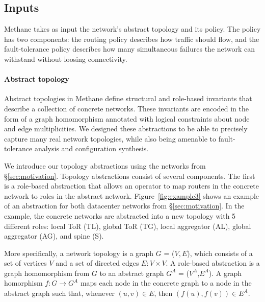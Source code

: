 \documentclass[numbers, 10pt, preprint]{sigplanconf}
\newcommand{\sysname}{{\small \sf Methane}\xspace}
\newcommand{\para}[1]{\paragraph*{\textbf{#1}}}
\begin{document}
\subsection{Inputs}

\sysname takes as input the network's abstract topology and its policy. The policy has two components: the routing policy describes how traffic should flow, and the fault-tolerance policy describes how many simultaneous failures the network can withstand without loosing connectivity.

\para{Abstract topology}
Abstract topologies in \sysname define structural and role-based invariants that describe a collection of concrete networks. These invariants are encoded in the form of a graph homomorphism annotated with logical constraints about node and edge multiplicities.
%
We designed these abstractions to be able to precisely capture many real network topologies, while also being amenable to fault-tolerance analysis and configuration synthesis.


We introduce our topology abstractions using the networks from \S\ref{sec:motivation}. Topology abstractions consist of several components.
The first is a role-based abstraction that allows an operator to map routers in the concrete network to roles in the abstract network. Figure~\ref{fig:example3} shows an example of an abstraction for both datacenter networks from \S\ref{sec:motivation}. In the example, the concrete networks are abstracted into a new topology with 5 different roles: local ToR (TL), global ToR (TG), local aggregator (AL), global aggregator (AG), and spine (S).

More specifically, a network topology is a graph $G$ = ($V, E$), which consists of a set of vertices $V$ and a set of directed edges $E \colon V \times V$. A role-based abstraction is a graph homomorphism from $G$ to an abstract graph $G^A$ = ($V^A$,$E^A$). A graph homorphism $f : G \rightarrow G^A$ maps each node in the concrete graph to a node in the abstract graph such that, whenever $(u,v) \in E$, then $(f(u),f(v)) \in E^A$.
\end{document}
